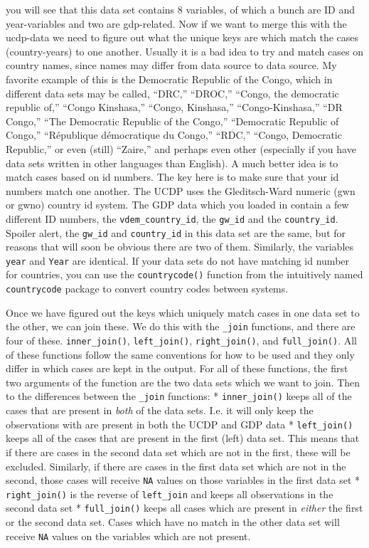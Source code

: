 \documentclass[
]{book}
\begin{document}
you will see that this data set contains 8 variables, of which a bunch are ID and year-variables and two are gdp-related. Now if we want to merge this with the ucdp-data we need to figure out what the unique keys are which match the cases (country-years) to one another. Usually it is a bad idea to try and match cases on country names, since names may differ from data source to data source. My favorite example of this is the Democratic Republic of the Congo, which in different data sets may be called, ``DRC,'' ``DROC,'' ``Congo, the democratic republic of,'' ``Congo Kinshasa,'' ``Congo, Kinshasa,'' ``Congo-Kinshasa,'' ``DR Congo,'' ``The Democratic Republic of the Congo,'' ``Democratic Republic of Congo,'' ``République démocratique du Congo,'' ``RDC,'' ``Congo, Democratic Republic,'' or even (still) ``Zaire,'' and perhaps even other (especially if you have data sets written in other languages than English). A much better idea is to match cases based on id numbers. The key here is to make sure that your id numbers match one another. The UCDP uses the Gleditsch-Ward numeric (gwn or gwno) country id system. The GDP data which you loaded in contain a few different ID numbers, the \texttt{vdem\_country\_id}, the \texttt{gw\_id} and the \texttt{country\_id}. Spoiler alert, the \texttt{gw\_id} and \texttt{country\_id} in this data set are the same, but for reasons that will soon be obvious there are two of them. Similarly, the variables \texttt{year} and \texttt{Year} are identical. If your data sets do not have matching id number for countries, you can use the \texttt{countrycode()} function from the intuitively named \texttt{countrycode} package to convert country codes between systems.

Once we have figured out the keys which uniquely match cases in one data set to the other, we can join these. We do this with the \texttt{\_join} functions, and there are four of these. \texttt{inner\_join()}, \texttt{left\_join()}, \texttt{right\_join()}, and \texttt{full\_join()}. All of these functions follow the same conventions for how to be used and they only differ in which cases are kept in the output. For all of these functions, the first two arguments of the function are the two data sets which we want to join. Then to the differences between the \texttt{\_join} functions:
* \texttt{inner\_join()} keeps all of the cases that are present in \emph{both} of the data sets. I.e. it will only keep the observations with are present in both the UCDP and GDP data
* \texttt{left\_join()} keeps all of the cases that are present in the first (left) data set. This means that if there are cases in the second data set which are not in the first, these will be excluded. Similarly, if there are cases in the first data set which are not in the second, those cases will receive \texttt{NA} values on those variables in the first data set
* \texttt{right\_join()} is the reverse of \texttt{left\_join} and keeps all observations in the second data set
* \texttt{full\_join()} keeps all cases which are present in \emph{either} the first or the second data set. Cases which have no match in the other data set will receive \texttt{NA} values on the variables which are not present.
\end{document}
